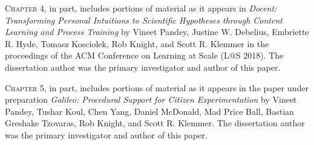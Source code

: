 \begin{frontmatter}
\begin{acknowledgements}
\textsc{Chapter 4}, in part, includes portions of material as it appears in \emph{Docent: Transforming Personal Intuitions to Scientific Hypotheses through Content Learning and Process Training} by Vineet Pandey, Justine W. Debelius, Embriette R. Hyde, Tomasz Kosciolek, Rob Knight, and Scott R. Klemmer in the proceedings of the ACM Conference on Learning at Scale (L@S 2018). The dissertation author was the primary investigator and author of this paper.

\textsc{Chapter 5}, in part, includes portions of material as it appears in the paper under preparation \emph{Galileo: Procedural Support for Citizen Experimentation} by Vineet Pandey, Tushar Koul, Chen Yang, Daniel McDonald, Mad Price Ball, Bastian Greshake Tzovaras, Rob Knight, and Scott R. Klemmer. The dissertation author was the primary investigator and author of this paper.

\end{acknowledgements}


\end{frontmatter}

